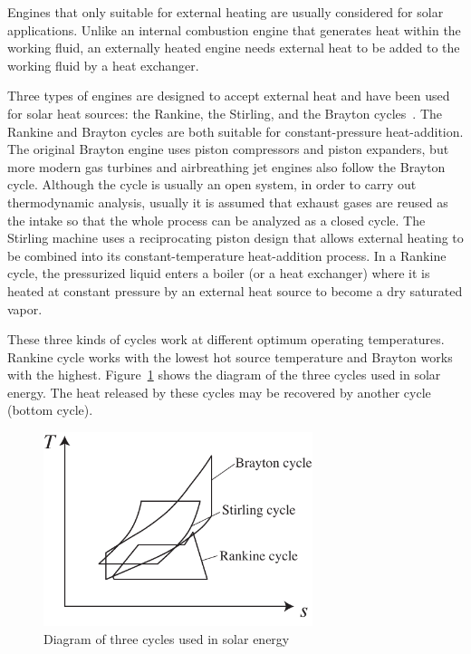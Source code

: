 Engines that only suitable for external heating are usually considered for solar applications. Unlike an internal combustion engine that generates heat within the working fluid, an externally heated engine needs external heat to be added to the working fluid by a heat exchanger.

Three types of engines are designed to accept external heat and have been used for solar heat sources: the Rankine, the Stirling, and the Brayton cycles~\cite{Roschke1979}. The Rankine and Brayton cycles are both suitable for constant-pressure heat-addition. 
The original Brayton engine uses piston compressors and piston expanders, but more modern gas turbines and airbreathing jet engines also follow the Brayton cycle. Although the cycle is usually an open system, in order to carry out thermodynamic analysis, usually it is assumed that exhaust gases are reused as the intake so that the whole process can be analyzed as a closed cycle.
The Stirling machine uses a reciprocating piston design that allows external heating to be combined into its constant-temperature heat-addition process. 
In a Rankine cycle, the pressurized liquid enters a boiler (or a heat exchanger) where it is heated at constant pressure by an external heat source to become a dry saturated vapor.

These three kinds of cycles work at different optimum operating temperatures. Rankine cycle works with the lowest hot source temperature and Brayton works with the highest. Figure~\ref{fig:cycles} shows the diagram of the three cycles used in solar energy. The heat released by these cycles may be recovered by another cycle (bottom cycle).

\begin{figure}[h]
\centering 
\includegraphics[width=0.7\textwidth]{fig/cycles}
\caption{Diagram of three cycles used in solar energy}\label{fig:cycles}
\end{figure}

